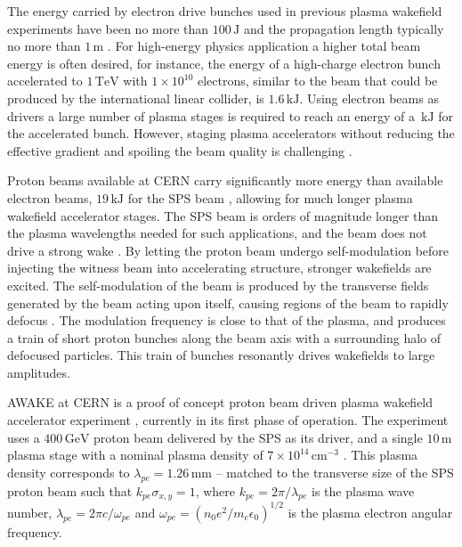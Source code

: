 \documentclass[aps,prstab,reprint,amsmath,amssymb,groupedaddress,onecolumn]{revtex4-1}
\newcommand{\unit}[1]{\,\mathrm{#1}}
\newcommand{\nexp}[1]{\times 10^{#1}}
\begin{document}
The energy carried by electron drive bunches used in previous plasma wakefield experiments have been no more than
$100\unit{J}$ and the propagation length typically no more than $1\unit{m}$ \cite{blumenfeld:2007,caldwell:2009}.  For high-energy physics application a higher total beam energy is often desired, for instance, the energy of a high-charge electron bunch accelerated to $1\unit{TeV}$ with $1\nexp{10}$ electrons, similar to the beam that could be produced by the
international linear collider, is $1.6\unit{kJ}$.  Using electron beams 
as drivers a large number of plasma stages is required to reach %
an energy of a $\unit{kJ}$ for the accelerated bunch. However, staging plasma accelerators without reducing the
effective gradient and spoiling the beam quality is challenging \cite{steinke:2016,lindstrom:2016}.

Proton beams available at CERN carry significantly more energy than available electron beams, $19\unit{kJ}$ for the SPS beam \cite{gschwendtner:2016},
allowing for much longer plasma wakefield accelerator stages. The SPS beam is orders of magnitude longer
than the plasma wavelengths needed for such applications, and the beam %
does not drive a strong wake \cite{gschwendtner:2016}.  By letting the proton beam undergo
self-modulation before injecting the witness beam into accelerating structure, %
stronger wakefields are %
excited. The self-modulation of the beam is
produced by the transverse fields generated by the beam acting upon itself, causing regions of the beam to rapidly
defocus \cite{kumar:2010}. The modulation frequency is close to that of the plasma, and produces a train of short proton
bunches along the beam axis with a surrounding halo of defocused particles. This train of bunches resonantly %
drives
wakefields to large %
amplitudes.

AWAKE at CERN is a proof of concept proton beam driven plasma wakefield
accelerator experiment \cite{awake_collaboration:2014}, currently in its first phase of operation. The experiment uses a $400\unit{GeV}$ proton beam delivered by the
SPS as its driver, and a single $10\unit{m}$ plasma stage with a nominal plasma density of $7\nexp{14}\unit{cm}^{-3}$
\cite{gschwendtner:2016}. This plasma density corresponds to $\lambda_{pe} = 1.26\unit{mm}$ -- matched to the transverse
size of the SPS proton beam such that $k_{pe}\sigma_{x,y} = 1$, where $k_{pe} = 2\pi/\lambda_{pe}$ is the plasma wave
number, %
$\lambda_{pe}=2\pi c/\omega_{pe}$ and $\omega_{pe}=\left(n_0e^2/m_e\epsilon_0\right)^{1/2}$ is the plasma electron angular frequency. %
\end{document}

